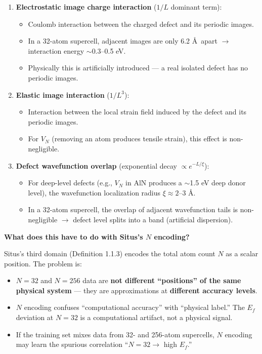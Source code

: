 \documentclass[
  12pt,
]{article}
\providecommand{\tightlist}{%
  \setlength{\itemsep}{0pt}\setlength{\parskip}{0pt}}
\begin{document}
\begin{enumerate}
\def\labelenumi{\arabic{enumi}.}
\tightlist
\item
  \textbf{Electrostatic image charge interaction} ($1/L$ dominant term):
  \begin{itemize}
  \tightlist
  \item
    Coulomb interaction between the charged defect and its periodic images.
  \item
    In a 32-atom supercell, adjacent images are only 6.2 \AA\ apart $\to$ interaction energy $\sim$0.3--0.5 eV.
  \item
    Physically this is artificially introduced --- a real isolated defect has no periodic images.
  \end{itemize}
\item
  \textbf{Elastic image interaction} ($1/L^3$):
  \begin{itemize}
  \tightlist
  \item
    Interaction between the local strain field induced by the defect and its periodic images.
  \item
    For $V_N$ (removing an atom produces tensile strain), this effect is non-negligible.
  \end{itemize}
\item
  \textbf{Defect wavefunction overlap} (exponential decay $\propto e^{-L/\xi}$):
  \begin{itemize}
  \tightlist
  \item
    For deep-level defects (e.g., $V_N$ in AlN produces a $\sim$1.5 eV deep donor level), the wavefunction localization radius $\xi \approx 2$--$3$ \AA.
  \item
    In a 32-atom supercell, the overlap of adjacent wavefunction tails is non-negligible $\to$ defect level splits into a band (artificial dispersion).
  \end{itemize}
\end{enumerate}

\textbf{What does this have to do with Situs's $N$ encoding?}

Situs's third domain (Definition 1.1.3) encodes the total atom count $N$ as a scalar position. The problem is:

\begin{itemize}
\tightlist
\item
  $N=32$ and $N=256$ data are \textbf{not different ``positions'' of the same physical system} --- they are approximations at \textbf{different accuracy levels}.
\item
  $N$ encoding confuses ``computational accuracy'' with ``physical label.'' The $E_f$ deviation at $N=32$ is a computational artifact, not a physical signal.
\item
  If the training set mixes data from 32- and 256-atom supercells, $N$ encoding may learn the spurious correlation ``$N=32 \to$ high $E_f$.''
\end{itemize}
\end{document}
